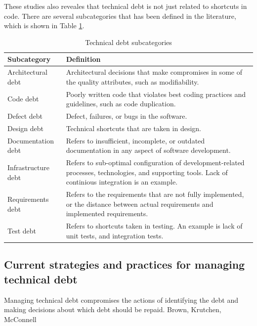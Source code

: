 These studies also reveales that technical debt is not just related to shortcuts in code. There are several subcategories that has been defined in the literature, which is shown in Table \ref{tab:subcategories}.

\begin{table}
	\centering
	\begin{tabular}{ | p{5cm} | p{8cm} |}
	\hline
	\textbf{Subcategory} & \textbf{Definition} \\ \hline
	Architectural debt\cite{li2015systematic,p8-codabux,foser076-brown} & Architectural decisions that make compromises in some of the quality attributes, such as modifiability. \\ \hline
	Code debt\cite{li2015systematic,foser076-brown,tom2013exploration} & Poorly written code that violates best coding practices and guidelines, such as code duplication. \\ \hline
	Defect debt\cite{li2015systematic,tom2013exploration} & Defect, failures, or bugs in the software. \\ \hline
	Design debt\cite{li2015systematic,Zazworka:2011:PDD:1985362.1985372,foser076-brown} & Technical shortcuts that are taken in design.\\ \hline
	Documentation debt\cite{li2015systematic,foser076-brown,Zazworka:2013:CSE:2460999.2461005} & Refers to insufficient, incomplete, or outdated documentation in any aspect of software development.\\ \hline
	Infrastructure debt\cite{li2015systematic,tom2013exploration,p8-codabux} & Refers to sub-optimal configuration of development-related processes, technologies, and supporting tools. Lack of continious integration is an example.\\ \hline
	Requirements debt\cite{li2015systematic,Zazworka:2013:CSE:2460999.2461005} & Refers to the requirements that are not fully implemented, or the distance between actual requirements and implemented requirements.\\ \hline
	Test debt\cite{li2015systematic,Zazworka:2013:CSE:2460999.2461005,foser076-brown} & Refers to shortcuts taken in testing. An example is lack of unit tests, and integration tests.\\
	\hline
	\end{tabular}
	\caption{Technical debt subcategories} \label{tab:subcategories}
\end{table}

\subsection{Current strategies and practices for managing technical debt}
Managing technical debt compromises the actions of identifying the debt and making decisions about which debt should be repaid. Brown, Krutchen, McConnell 

